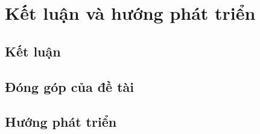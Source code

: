 \section{Kết luận và hướng phát triển}
\subsection{Kết luận}
\subsection{Đóng góp của đề tài}
\subsection{Hướng phát triển}
